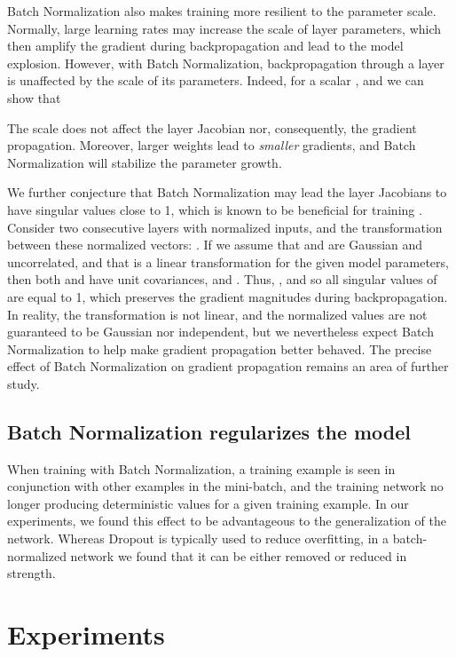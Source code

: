 \documentclass[twocolumn]{article}
\begin{document}
Batch Normalization also makes training more resilient to the parameter scale. Normally, large learning rates 
may increase the scale of layer parameters, which then amplify the gradient during backpropagation and lead to the model explosion.
  However, with Batch Normalization, backpropagation through a layer is unaffected by the scale of its parameters.  Indeed, for a scalar ,   and we can show that

The scale does not affect the layer Jacobian nor, consequently, the gradient propagation. Moreover, larger weights lead to {\em smaller} gradients, and Batch Normalization will stabilize the parameter growth.

We further conjecture that Batch Normalization may lead the layer Jacobians to
have singular values close to 1, which is known to be beneficial for training \cite{iclr-dynamics}. Consider two consecutive layers with normalized inputs, and the transformation  between these  normalized  vectors:
. If we assume that   and  are Gaussian and uncorrelated, and 
that  is a linear transformation for the given model
parameters, then both  and  have unit covariances, and  . Thus, , and so all
singular values of  are equal to 1, which  preserves the
gradient magnitudes during backpropagation. In reality, the transformation is
not linear, and the normalized values are not guaranteed to be Gaussian nor independent, but we nevertheless expect Batch Normalization to help make gradient propagation  better behaved. The precise effect of Batch
Normalization on gradient propagation remains an area of further study.


\subsection{Batch Normalization  regularizes the model} 
\label{sec-regularizer}
When training with Batch Normalization, a training example is seen in
conjunction with other examples in the mini-batch, and the training network no longer
producing deterministic values for a given training example. In our
experiments, we found  this effect to be advantageous to the
generalization of the network. Whereas Dropout \cite{dropout} is
typically used to reduce overfitting, in a batch-normalized network
we found that it can be either removed  or reduced in strength.



\section{Experiments}
\end{document}
